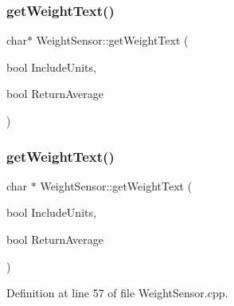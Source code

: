 \subsubsection{\texorpdfstring{get\+Weight\+Text()}{getWeightText()}\hspace{0.1cm}{\footnotesize\ttfamily [1/2]}}
{\footnotesize\ttfamily char$\ast$ Weight\+Sensor\+::get\+Weight\+Text (\begin{DoxyParamCaption}\item[{bool}]{Include\+Units,  }\item[{bool}]{Return\+Average }\end{DoxyParamCaption})}

\mbox{\label{class_weight_sensor_a4435433225f8b58950161e5a580d763e}} 
\subsubsection{\texorpdfstring{get\+Weight\+Text()}{getWeightText()}\hspace{0.1cm}{\footnotesize\ttfamily [2/2]}}
{\footnotesize\ttfamily char $\ast$ Weight\+Sensor\+::get\+Weight\+Text (\begin{DoxyParamCaption}\item[{bool}]{Include\+Units,  }\item[{bool}]{Return\+Average }\end{DoxyParamCaption})}



Definition at line 57 of file Weight\+Sensor.\+cpp.

